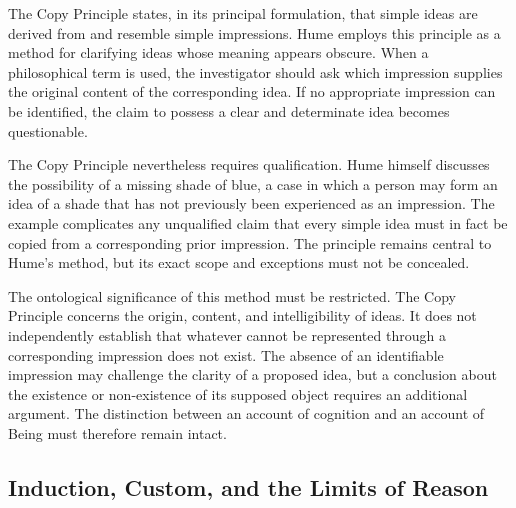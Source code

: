 \label{para:VS.B01.P01.C08.S09.SS03.P002}

The Copy Principle states, in its principal formulation,
that simple ideas are derived from and resemble simple
impressions. Hume employs this principle as a method
for clarifying ideas whose meaning appears obscure.
When a philosophical term is used, the investigator
should ask which impression supplies the original
content of the corresponding idea. If no appropriate
impression can be identified, the claim to possess a
clear and determinate idea becomes questionable.
\cite[1.1.1--2, SBN 1--10]{HumeTreatise}
\cite[2.5--9, SBN 17--22]{HumeEnquiry}

\label{para:VS.B01.P01.C08.S09.SS03.P003}

The Copy Principle nevertheless requires qualification.
Hume himself discusses the possibility of a missing
shade of blue, a case in which a person may form an
idea of a shade that has not previously been experienced
as an impression. The example complicates any
unqualified claim that every simple idea must in fact
be copied from a corresponding prior impression.
The principle remains central to Hume's method, but
its exact scope and exceptions must not be concealed.
\cite[2.8, SBN 20--21]{HumeEnquiry}

\label{para:VS.B01.P01.C08.S09.SS03.P004}

The ontological significance of this method must be
restricted. The Copy Principle concerns the origin,
content, and intelligibility of ideas. It does not
independently establish that whatever cannot be
represented through a corresponding impression does
not exist. The absence of an identifiable impression
may challenge the clarity of a proposed idea, but
a conclusion about the existence or non-existence
of its supposed object requires an additional argument.
The distinction between an account of cognition and
an account of Being must therefore remain intact.



\subsection{Induction, Custom, and the Limits of Reason}
\label{subsec:ch08-hume-induction}

